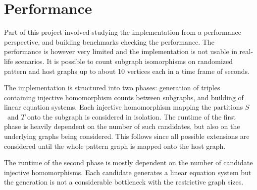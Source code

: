 \documentclass[a4paper,11pt]{report}
\theoremstyle{plain}
\theoremstyle{definition}
\begin{document}
\section{Performance}
Part of this project involved studying the implementation from a performance perspective, and building benchmarks checking the performance.
The performance is however very limited and the implementation is not usable in real-life scenarios.
It is possible to count subgraph isomorphisms on randomized pattern and host graphs up to about 10 vertices each in a time frame of seconds.

The implementation is structured into two phases: generation of triples containing injective homomorphism counts between subgraphs, and building of linear equation systems.
Each injective homomorphism mapping the partitions $S$ and $T$ onto the subgraph is considered in isolation.
The runtime of the first phase is heavily dependent on the number of such candidates, but also on the underlying graphs being considered.
This follows since all possible extensions are considered until the whole pattern graph is mapped onto the host graph.

The runtime of the second phase is mostly dependent on the number of candidate injective homomorphisms.
Each candidate generates a linear equation system but the generation is not a considerable bottleneck with the restrictive graph sizes.
\end{document}
